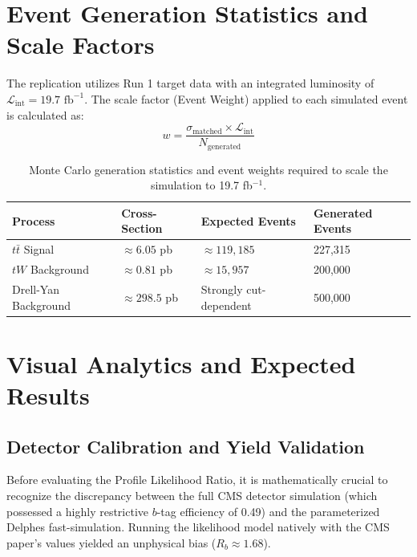 \documentclass[11pt,a4paper]{article}
\begin{document}
\section{Event Generation Statistics and Scale Factors}
The replication utilizes Run 1 target data with an integrated luminosity of $\mathcal{L}_{\text{int}} = 19.7 \text{ fb}^{-1}$. The scale factor (Event Weight) applied to each simulated event is calculated as:
\begin{equation}
w = \frac{\sigma_{\text{matched}} \times \mathcal{L}_{\text{int}}}{N_{\text{generated}}}
\end{equation}

\begin{table}[H]
\centering
\caption{Monte Carlo generation statistics and event weights required to scale the simulation to 19.7 fb$^{-1}$.}
\vspace{0.2cm}
\begin{tabular}{@{}llll@{}}
\toprule
\textbf{Process} & \textbf{Cross-Section} & \textbf{Expected Events} & \textbf{Generated Events} \\ \midrule
$t\bar{t}$ Signal & $\approx 6.05$ pb & $\approx 119,185$ & 227,315 \\
$tW$ Background & $\approx 0.81$ pb & $\approx 15,957$ & 200,000 \\
Drell-Yan Background & $\approx 298.5$ pb & Strongly cut-dependent & 500,000 \\ \bottomrule
\end{tabular}
\end{table}

\section{Visual Analytics and Expected Results}

\subsection{Detector Calibration and Yield Validation}
Before evaluating the Profile Likelihood Ratio, it is mathematically crucial to recognize the discrepancy between the full CMS detector simulation (which possessed a highly restrictive $b$-tag efficiency of 0.49) and the parameterized Delphes fast-simulation. Running the likelihood model natively with the CMS paper's values yielded an unphysical bias ($R_b \approx 1.68$). 
\end{document}

